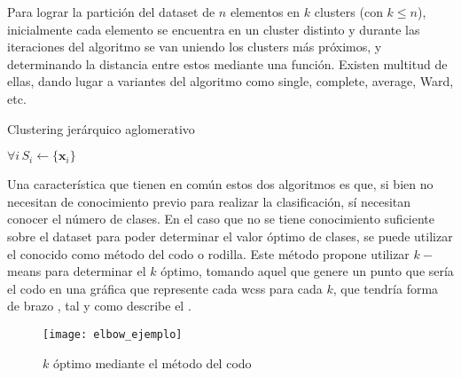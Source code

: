 				Para lograr la partición del dataset de $n$ elementos en $k$ clusters (con $k \leq n$), inicialmente cada elemento se encuentra en un cluster distinto y durante las iteraciones del algoritmo se van uniendo los clusters más próximos, y determinando la distancia entre estos mediante una función. Existen multitud de ellas, dando lugar a variantes del algoritmo como single, complete, average, Ward, etc. \cite{ahc_variantes}\\
				
				\begin{algorithm}
					\DontPrintSemicolon
					
					\caption{Clustering jerárquico aglomerativo}
					\label{algo:ahc}
					
					$\forall i \, S_i \gets \{\textbf{x}_i\}$\\
				\end{algorithm}
				
				Una característica que tienen en común estos dos algoritmos es que, si bien no necesitan de conocimiento previo para realizar la clasificación, sí necesitan conocer el número de clases. En el caso que no se tiene conocimiento suficiente sobre el dataset para poder determinar el valor óptimo de clases, se puede utilizar el conocido como método del codo o rodilla. Este método propone utilizar $k-$means para determinar el $k$ óptimo, tomando aquel que genere un punto que sería el codo en una gráfica que represente cada \gls{wcss} para cada $k$, que tendría forma de brazo \cite{elbow}, tal y como describe el . \\
				
				\begin{figure}[!h]
					\centering
					\texttt{[image: elbow\_ejemplo]}
					\caption{$k$ óptimo mediante el método del codo}
					\label{fig:ejemplo_codo}
				\end{figure}
				
